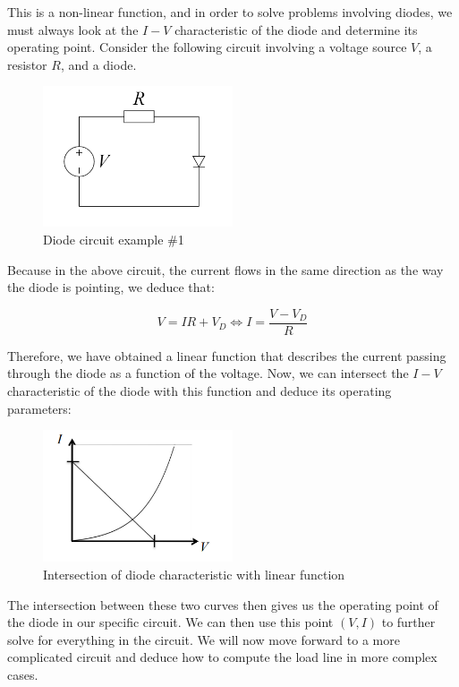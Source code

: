 \documentclass{article}
\begin{document}
This is a non-linear function, and in order to solve problems involving diodes, we must always look at the $I-V$ characteristic of the diode and determine its operating point. Consider the following circuit involving a voltage source $V$, a resistor $R$, and a diode.

\begin{figure}[h]
    \centering
    \includegraphics[width=0.5\textwidth]{images/diode2.png}
    \caption{Diode circuit example \#1}
    \label{fig:diode2}
\end{figure}

Because in the above circuit, the current flows in the same direction as the way the diode is pointing, we deduce that:

\[ V = IR + V_D \iff I = \frac{V - V_D}{R} \]

Therefore, we have obtained a linear function that describes the current passing through the diode as a function of the voltage. Now, we can intersect the $I-V$ characteristic of the diode with this function and deduce its operating parameters:

\begin{figure}[h]
    \centering
    \includegraphics[width = 0.5\textwidth]{images/diode3.png}
    \caption{Intersection of diode characteristic with linear function}
    \label{fig:diode3}
\end{figure}

The intersection between these two curves then gives us the operating point of the diode in our specific circuit. We can then use this point $(V, I)$ to further solve for everything in the circuit. We will now move forward to a more complicated circuit and deduce how to compute the load line in more complex cases.
\end{document}
